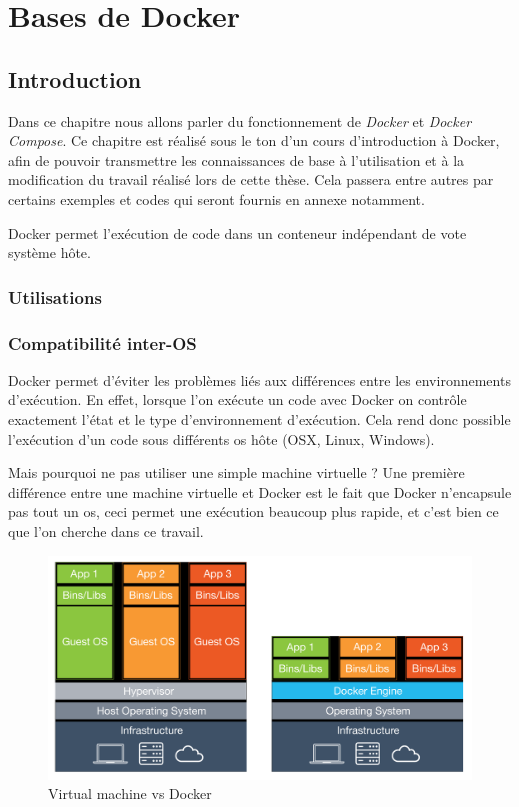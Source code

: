 \chapter{Bases de Docker}
\label{ch:docker}

\section{Introduction}
Dans ce chapitre nous allons parler du fonctionnement de \emph{Docker} et \emph{Docker Compose}. Ce chapitre est réalisé sous le ton d'un cours d'introduction à Docker, afin de pouvoir transmettre les connaissances de base à l'utilisation et à la modification du travail réalisé lors de cette thèse. Cela passera entre autres par certains exemples et codes qui seront fournis en annexe notamment.

Docker permet l'exécution de code dans un conteneur indépendant de vote système hôte. 

\subsection{Utilisations}
\subsection{Compatibilité inter-OS}
Docker permet d'éviter les problèmes liés aux différences entre les environnements d'exécution. En effet, lorsque l'on exécute un code avec Docker on contrôle exactement l'état et le type d'environnement d'exécution. Cela rend donc possible l'exécution d'un code sous différents \gls{os} hôte (OSX, Linux, Windows).

Mais pourquoi ne pas utiliser une simple machine virtuelle ? Une première différence entre une machine virtuelle et Docker est le fait que Docker n'encapsule pas tout un \gls{os}, ceci permet une exécution beaucoup plus rapide, et c'est bien ce que l'on cherche dans ce travail.

\begin{figure}[H] 
\centering 
\includegraphics[width=1\columnwidth]{img/vm-vs-docker-container} 
\caption[vm vs Docker]{Virtual machine vs Docker}
\label{fig:vs} 
\end{figure}

